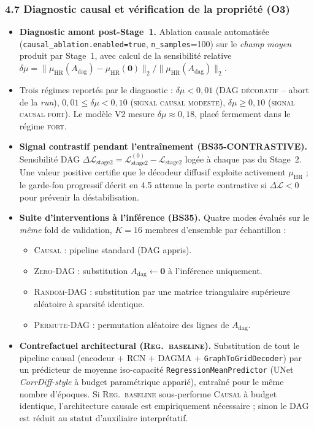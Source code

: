 \documentclass[12pt,a4paper]{article}
\begin{document}
\subsubsection*{4.7 Diagnostic causal et v\'erification de la propri\'et\'e (O3)}
\begin{itemize}
    \item \textbf{Diagnostic amont post-Stage~1.} Ablation causale automatis\'ee (\texttt{causal\_ablation.enabled=true}, \texttt{n\_samples}=100) sur le \emph{champ moyen} produit par Stage~1, avec calcul de la sensibilit\'e relative $\delta\mu = \|\mu_{\mathrm{HR}}(A_{\mathrm{dag}}) - \mu_{\mathrm{HR}}(\mathbf{0})\|_2 / \|\mu_{\mathrm{HR}}(A_{\mathrm{dag}})\|_2$.
    \item Trois r\'egimes report\'es par le diagnostic : $\delta\mu < 0{,}01$ (\textsc{DAG d\'ecoratif} -- abort de la \emph{run}), $0{,}01 \leq \delta\mu < 0{,}10$ (\textsc{signal causal modeste}), $\delta\mu \geq 0{,}10$ (\textsc{signal causal fort}). Le mod\`ele V2 mesure $\delta\mu \approx 0{,}18$, plac\'e fermement dans le r\'egime \textsc{fort}.
    \item \textbf{Signal contrastif pendant l'entra\^inement (BS35-CONTRASTIVE).} Sensibilit\'e DAG $\Delta\mathcal{L}_{\text{stage2}} = \mathcal{L}_{\text{stage2}}^{(0)} - \mathcal{L}_{\text{stage2}}$ log\'ee \`a chaque pas du Stage~2. Une valeur positive certifie que le d\'ecodeur diffusif exploite activement $\mu_{\mathrm{HR}}$ ; le garde-fou progressif d\'ecrit en 4.5 attenue la perte contrastive si $\Delta\mathcal{L} < 0$ pour pr\'evenir la d\'estabilisation.
    \item \textbf{Suite d'interventions \`a l'inf\'erence (BS35).} Quatre modes \'evalu\'es sur le \emph{m\^eme} fold de validation, $K=16$ membres d'ensemble par \'echantillon :
    \begin{itemize}
        \item \textsc{Causal} : pipeline standard (DAG appris).
        \item \textsc{Zero-DAG} : substitution $A_{\mathrm{dag}} \leftarrow \mathbf{0}$ \`a l'inf\'erence uniquement.
        \item \textsc{Random-DAG} : substitution par une matrice triangulaire sup\'erieure al\'eatoire \`a sparsit\'e identique.
        \item \textsc{Permute-DAG} : permutation al\'eatoire des lignes de $A_{\mathrm{dag}}$.
    \end{itemize}
    \item \textbf{Contrefactuel architectural (\textsc{Reg.\ baseline}).} Substitution de tout le pipeline causal (encodeur + RCN + DAGMA + \texttt{GraphToGridDecoder}) par un pr\'edicteur de moyenne iso-capacit\'e \texttt{RegressionMeanPredictor} (UNet \emph{CorrDiff-style} \`a budget param\'etrique appari\'e), entra\^in\'e pour le m\^eme nombre d'\'epoques. Si \textsc{Reg.\ baseline} sous-performe \textsc{Causal} \`a budget identique, l'architecture causale est empiriquement n\'ecessaire ; sinon le DAG est r\'eduit au statut d'auxiliaire interpr\'etatif.

\end{itemize}
\end{document}
